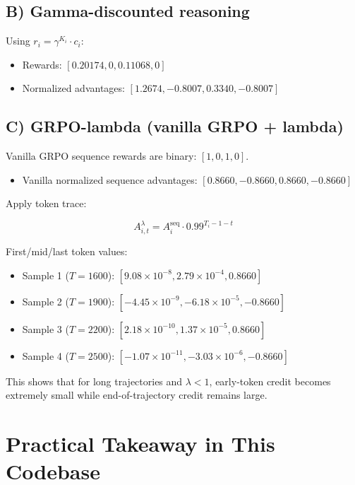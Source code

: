 \documentclass[11pt]{article}
\begin{document}
\subsection*{B) Gamma-discounted reasoning}

Using $r_i=\gamma^{K_i}\cdot c_i$:

\begin{itemize}
\item Rewards: $[0.20174,0,0.11068,0]$
\item Normalized advantages: $[1.2674,-0.8007,0.3340,-0.8007]$
\end{itemize}

\subsection*{C) GRPO-lambda (vanilla GRPO + lambda)}

Vanilla GRPO sequence rewards are binary: $[1,0,1,0]$.

\begin{itemize}
\item Vanilla normalized sequence advantages: $[0.8660,-0.8660,0.8660,-0.8660]$
\end{itemize}

Apply token trace:

\begin{equation}
A_{i,t}^{\lambda}=A_i^{\mathrm{seq}}\cdot 0.99^{T_i-1-t}
\end{equation}

First/mid/last token values:

\begin{itemize}
\item Sample 1 ($T=1600$): $[9.08\times10^{-8},2.79\times10^{-4},0.8660]$
\item Sample 2 ($T=1900$): $[-4.45\times10^{-9},-6.18\times10^{-5},-0.8660]$
\item Sample 3 ($T=2200$): $[2.18\times10^{-10},1.37\times10^{-5},0.8660]$
\item Sample 4 ($T=2500$): $[-1.07\times10^{-11},-3.03\times10^{-6},-0.8660]$
\end{itemize}

This shows that for long trajectories and $\lambda<1$, early-token credit becomes extremely small while end-of-trajectory credit remains large.

\section{Practical Takeaway in This Codebase}
\end{document}
